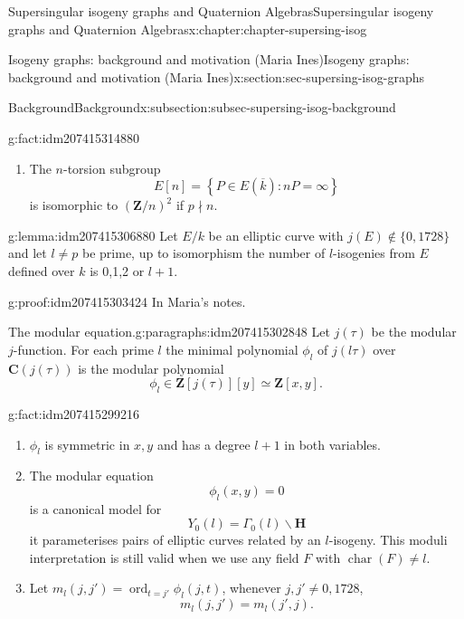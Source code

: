 \documentclass[oneside,10pt,]{book}
\numberwithin{equation}{section}
\newcommand{\lb}{[}
\newcommand{\rb}{]}
\newcommand{\ZZ}{\mathbf{Z}}
\newcommand{\CC}{\mathbf{C}}
\newcommand{\HH}{\mathbf{H}}
\DeclareMathOperator{\characteristic}{char}
\DeclareMathOperator{\ord}{ord}
\begin{document}
\begin{chapterptx}{Supersingular isogeny graphs and Quaternion Algebras}{}{Supersingular isogeny graphs and Quaternion Algebras}{}{}{x:chapter:chapter-supersing-isog}
\begin{sectionptx}{Isogeny graphs: background and motivation (Maria Ines)}{}{Isogeny graphs: background and motivation (Maria Ines)}{}{}{x:section:sec-supersing-isog-graphs}
\begin{subsectionptx}{Background}{}{Background}{}{}{x:subsection:subsec-supersing-isog-background}
\begin{fact}{}{}{g:fact:idm207415314880}
\begin{enumerate}
\begin{equation*}
\end{equation*}
the multiplication-by-\(n \) map.%
\item{}The \(n\)-torsion subgroup%
\begin{equation*}
E\lb n \rb = \left\{ P \in E(\overline k) : nP = \infty\right\}
\end{equation*}
is isomorphic to \((\ZZ/n)^2\) if \(p\nmid n\).%
\end{enumerate}
%
\end{fact}
\begin{lemma}{}{}{g:lemma:idm207415306880}%
Let \(E/k\) be an elliptic curve with \(j(E) \not\in\{0,1728\}\) and let \(l\ne p\) be prime, up to isomorphism the number of \(l\)-isogenies from \(E\) defined over \(k\) is 0,1,2 or \(l+1\).%
\end{lemma}
\begin{proofptx}{}{g:proof:idm207415303424}
In Maria's notes.%
\end{proofptx}
\begin{paragraphs}{The modular equation.}{g:paragraphs:idm207415302848}%
Let \(j(\tau)\) be the modular \(j\)-function. For each prime \(l\) the minimal polynomial \(\phi_l\) of \(j(l\tau)\) over \(\CC (j(\tau))\) is the modular polynomial%
\begin{equation*}
\phi_l \in \ZZ[j(\tau)][y] \simeq \ZZ[x,y]\text{.}
\end{equation*}
%
\begin{fact}{}{}{g:fact:idm207415299216}%
%
\begin{enumerate}
\item{}\(\phi_l\) is symmetric in \(x,y\) and has a degree \(l+1\) in both variables.%
\item{}The modular equation%
\begin{equation*}
\phi_l (x,y) = 0
\end{equation*}
is a canonical model for%
\begin{equation*}
Y_0(l) = \Gamma_0(l) \backslash \HH
\end{equation*}
it parameterises pairs of elliptic curves related by an \(l\)-isogeny. This moduli interpretation is still valid when we use any field \(F\) with \(\characteristic(F) \ne l\).%
\item{}Let \(m_l(j,j') = \ord_{t = j'} \phi_l(j,t)\), whenever \(j,j' \ne 0,1728\),%
\begin{equation*}
m_l(j,j') = m_l(j',j)\text{.}
\end{equation*}
%
\end{enumerate}
%
\end{fact}

\end{paragraphs}
\end{subsectionptx}
\end{sectionptx}
\end{chapterptx}
\end{document}
